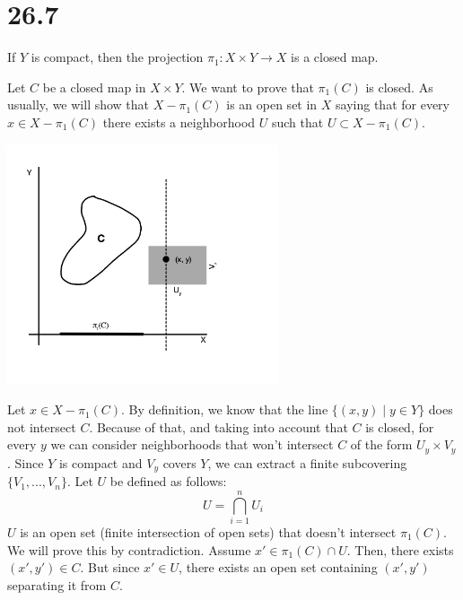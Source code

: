 \documentclass{article}
\begin{document}
    \section*{26.7}
    \begin{tcolorbox}[title=Statement]
        If $Y$ is compact, then the projection $\pi_1\colon X \times Y \to X$ is a closed map.
    \end{tcolorbox}
    \noindent
    Let $C$ be a closed map in $X \times Y$. We want to prove that $\pi_1(C)$ is closed. As usually, we will show that $X - \pi_1(C)$ is an open set in $X$ saying that for every $x \in X - \pi_1(C)$ there exists a neighborhood $U$ such that $U \subset X - \pi_1(C)$. 
    \begin{center}
        \includegraphics[width=0.6\textwidth]{diagram1.png}
    \end{center}
    Let $x \in X - \pi_1(C)$. By definition, we know that the line $\{(x, y) \mid y \in Y\}$ does not intersect $C$. Because of that, and taking into account that $C$ is closed, for every $y$ we can consider neighborhoods that won't intersect $C$ of the form $U_y \times V_y$. Since $Y$ is compact and $V_y$ covers $Y$, we can extract a finite subcovering $\{V_1, ..., V_n\}$. Let $U$ be defined as follows:
    \begin{equation*}
        U = \bigcap_{i=1}^{n}{U_i}
    \end{equation*}
    $U$ is an open set (finite intersection of open sets) that doesn't intersect $\pi_1(C)$. We will prove this by contradiction. Assume $x' \in \pi_1(C) \cap U$. Then, there exists $(x', y') \in C$. But since $x' \in U$, there exists an open set containing $(x', y')$ separating it from $C$.
    
\end{document}
